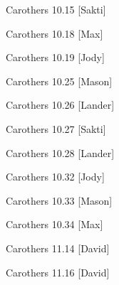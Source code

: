\documentclass[minion]{homework}
\begin{document}
\begin{aproblems}

\hproblem Carothers  10.15 [Sakti]

\hproblem Carothers  10.18 [Max]

\hproblem Carothers  10.19 [Jody]

\hproblem Carothers  10.25 [Mason]

\hproblem Carothers  10.26 [Lander]

\hproblem Carothers  10.27 [Sakti]

\hproblem Carothers 10.28 [Lander]

\hproblem Carothers 10.32 [Jody]

\hproblem Carothers 10.33 [Mason]

\hproblem Carothers  10.34 [Max]

\hproblem Carothers 11.14 [David]

\hproblem Carothers 11.16 [David]

\end{aproblems}
\end{document}
